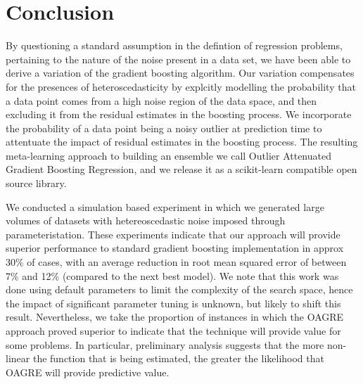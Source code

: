 \documentclass[12pt,a4paper]{article}
\begin{document}
\section{Conclusion}

By questioning a standard assumption in the defintion of regression problems, pertaining to the nature of the noise 
present in a data set, we have been able to derive a variation of the gradient boosting algorithm. Our variation 
compensates for the presences of heteroscedasticity by explcitly modelling the probability that a data point comes
from a high noise region of the data space, and then excluding it from the residual estimates in the boosting process.
We incorporate the probability of a data point being a noisy outlier at prediction time to attentuate the impact of 
residual estimates in the boosting process. 
The resulting meta-learning approach to building an ensemble we call Outlier Attenuated Gradient
Boosting Regression, and we release it as a scikit-learn compatible open source library. 

We conducted a simulation based experiment in which we generated large volumes of datasets with hetereoscedastic noise
imposed through parameteristation. These experiments indicate that our approach will provide superior
performance to standard gradient boosting implementation in approx 30\% of cases, with an average reduction in root mean
squared error of between 7\% and 12\% (compared to the next best model). 
We note that this work was done using default parameters to limit the complexity of the search space, hence the impact of 
significant parameter tuning is unknown, but likely to shift this result. Nevertheless, we take the proportion of instances
in which the OAGRE approach proved superior to indicate that the technique will provide value for some problems. In particular,
preliminary analysis suggests that the more non-linear the function that is being estimated, the greater the likelihood that
OAGRE will provide predictive value.



\end{document}
